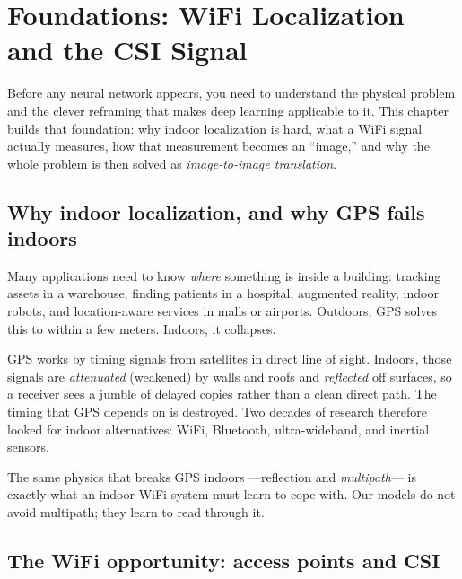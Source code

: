 \chapter{Foundations: WiFi Localization and the CSI Signal}
\label{ch:foundations}

Before any neural network appears, you need to understand the physical problem and the clever
reframing that makes deep learning applicable to it. This chapter builds that foundation: why indoor
localization is hard, what a WiFi signal actually measures, how that measurement becomes an
``image,'' and why the whole problem is then solved as \emph{image-to-image translation}.

\section{Why indoor localization, and why GPS fails indoors}
\label{sec:found:gps}

Many applications need to know \emph{where} something is inside a building: tracking assets in a
warehouse, finding patients in a hospital, augmented reality, indoor robots, and location-aware
services in malls or airports. Outdoors, GPS solves this to within a few meters. Indoors, it
collapses.

GPS works by timing signals from satellites in direct line of sight. Indoors, those signals are
\emph{attenuated} (weakened) by walls and roofs and \emph{reflected} off surfaces, so a receiver sees
a jumble of delayed copies rather than a clean direct path. The timing that GPS depends on is
destroyed. Two decades of research therefore looked for indoor alternatives: WiFi, Bluetooth,
ultra-wideband, and inertial sensors.

\begin{keyidea}
The same physics that breaks GPS indoors ---reflection and \emph{multipath}--- is exactly what an
indoor WiFi system must learn to cope with. Our models do not avoid multipath; they learn to read
through it.
\end{keyidea}

\section{The WiFi opportunity: access points and CSI}
\label{sec:found:wifi}

